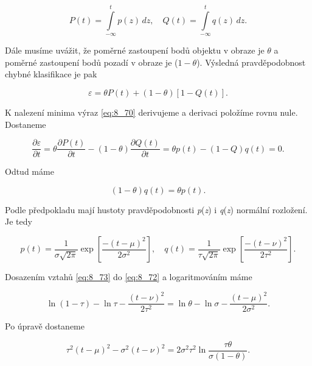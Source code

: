 \begin{equation} \label{eq:8_69}
    P(t) = \int\limits_{-\infty}^{t} p(z)\,dz, \quad Q(t) = \int\limits_{-\infty}^{t} q(z)\,dz .
\end{equation}

Dále musíme uvážit, že poměrné zastoupení bodů objektu v obraze je $\theta$ a poměrné zastoupení bodů pozadí v obraze je ($1-\theta$). Výsledná pravděpodobnost chybné klasifikace je pak

\begin{equation} \label{eq:8_70}
    \varepsilon = \theta P(t) + (1 - \theta)[1 - Q(t)] .
\end{equation}

K nalezení minima výraz \eqref{eq:8_70} derivujeme a derivaci položíme rovnu nule. Dostaneme

\begin{equation} \label{eq:8_71}
    \frac{\partial\varepsilon}{\partial t} = \theta \frac{\partial P(t)}{\partial t} - (1 - \theta) \frac{\partial Q(t)}{\partial t} = \theta p(t) - (1 - Q)q(t) = 0 .
\end{equation}

Odtud máme

\begin{equation} \label{eq:8_72}
    (1 - \theta) q(t) = \theta p(t) .
\end{equation}

Podle předpokladu mají hustoty pravděpodobnosti \textit{p}(\textit{z}) i \textit{q}(\textit{z}) normální rozložení. Je tedy

\begin{equation} \label{eq:8_73}
    p(t) = \frac{1}{\sigma\sqrt{2\pi}} \exp \left[ \frac{-(t - \mu)^2}{2\sigma^2} \right], \quad q(t) = \frac{1}{\tau\sqrt{2\pi}} \exp \left[ \frac{-(t - \nu)^2}{2\tau^2} \right].
\end{equation}

Dosazením vztahů \eqref{eq:8_73} do \eqref{eq:8_72} a logaritmováním máme

\begin{equation} \label{eq:8_74}
    \ln (1 - \tau) - \ln \tau - \frac{(t - \nu)^2}{2\tau^2} = \ln \theta - \ln \sigma - \frac{(t - \mu)^2}{2\sigma^2}.
\end{equation}

Po úpravě dostaneme

\begin{equation} \label{eq:8_75}
    \tau^2 (t - \mu)^2 - \sigma^2 (t - \nu)^2 = 2\sigma^2\tau^2\ln \frac{\tau\theta}{\sigma(1-\theta)}.
\end{equation}

